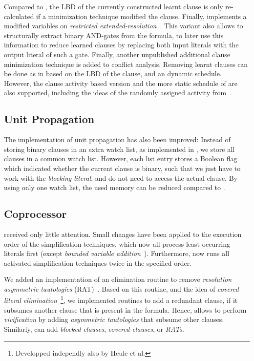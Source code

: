 \documentclass[conference]{IEEEtran}
\begin{document}
Compared to \glucose, the LBD of the currently constructed learnt clause is only re-calculated if a minimization technique modified the clause.
Finally, \riss implements a modified variables on \emph{restricted extended-resolution}~\cite{DBLP:conf/aaai/AudemardKS10,MextendedResolutionInModernSAT}. 
This variant also allows to structurally extract binary AND-gates from the formula, to later use this information to reduce learned clauses by replacing both input literals with the output literal of such a gate. 
Finally, another unpublished additional clause minimization technique is added to conflict analysis. 
Removing learnt clauses can be done as in \glucose based on the LBD of the clause, and an dynamic schedule. 
However, the clause activity based version and the more static schedule of \minisat are also supported, including the ideas of the randomly assigned activity from~\cite{DBLP:journals/corr/JabbourLSS14}. 

\subsection{Unit Propagation}

The implementation of unit propagation has also been improved: 
Instead of storing binary clauses in an extra watch list, as implemented in \glucose, we store all clauses in a common watch list. 
However, each list entry stores a Boolean flag which indicated whether the current clause is binary, such that we just have to work with the \emph{blocking literal}, and do not need to access the actual clause. 
By using only one watch list, the used memory can be reduced compared to \glucose.

\subsection{Coprocessor}

\coprocessor received only little attention. 
Small changes have been applied to the execution order of the simplification techniques, which now all process least occurring literals first (except \emph{bounded variable addition}~\cite{Mbva}). 
Furthermore, \coprocessor now runs all activated simplification techniques twice in the specified order. 

We added an implementation of an elimination routine to remove \emph{resolution asymmetric tautologies} (RAT)~\cite{inprocessingRules}. 
Based on this routine, and the idea of \emph{covered literal elimination}~\cite{MclePPdrat}\footnote{Developped independly also by Heule et al.}, we implemented routines to add a redundant clause, if it subsumes another clause that is present in the formula. 
Hence, \coprocessor allows to perform \emph{vivification} by adding \emph{asymmetric tautologies} that subsume other clauses. 
Similarly, \coprocessor can add \emph{blocked clauses}, \emph{covered clauses}, or \emph{RATs}. 
\end{document}
